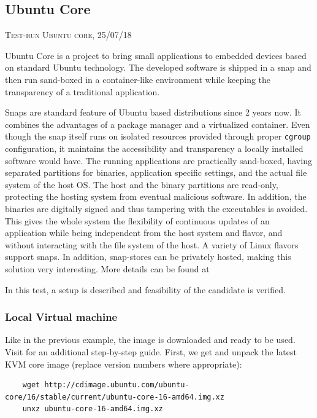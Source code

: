 \documentclass[]{scrartcl}
\begin{document}
\subsection{Ubuntu Core}
{\small\textsc{Test-run Ubuntu core, 25/07/18} \bigskip}

Ubuntu Core is a project to bring small applications to embedded devices based on standard Ubuntu technology. The developed software is shipped in a snap and then run sand-boxed in a container-like environment while keeping the transparency of a traditional application. 

Snaps are standard feature of Ubuntu based distributions since 2 years now. It combines the advantages of a package manager and a virtualized container. Even though the snap itself runs on isolated resources provided through proper \texttt{cgroup} configuration, it maintains the accessibility and transparency a locally installed software would have. The running applications are practically sand-boxed, having separated partitions for binaries, application specific settings, and the actual file system of the host OS. The host and the binary partitions are read-only, protecting the hosting system from eventual malicious software. In addition, the binaries are digitally signed and thus tampering with the executables is avoided. This gives the whole system the flexibility of continuous updates of an application while being independent from the host system and flavor, and without interacting with the file system of the host.
A variety of Linux flavors support snaps. In addition, snap-stores can be privately hosted, making this solution very interesting. More details can be found at \cite{snap01}

In this test, a setup is described and feasibility of the candidate is verified.

\subsubsection{Local Virtual machine}

Like in the previous example, the image is downloaded and ready to be used. Visit \cite{ubuntu01} for an additional step-by-step guide.
First, we get and unpack the latest KVM core image (replace version numbers where appropriate):

\begin{verbatim}
	wget http://cdimage.ubuntu.com/ubuntu-core/16/stable/current/ubuntu-core-16-amd64.img.xz
	unxz ubuntu-core-16-amd64.img.xz
\end{verbatim}
\end{document}
